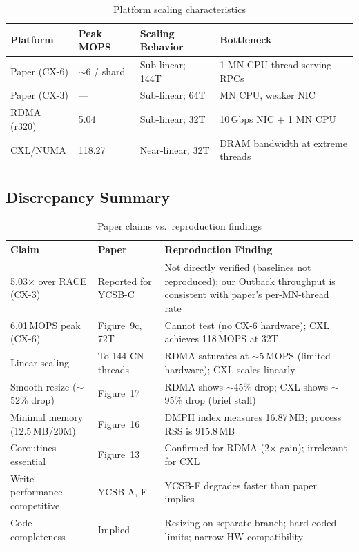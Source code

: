 \documentclass[11pt,a4paper]{article}
\begin{document}
\begin{table}[H]
\centering
\caption{Platform scaling characteristics}
\label{tab:scaling}
\small
\begin{tabular}{@{}p{2.5cm}p{2cm}p{3.3cm}p{4.5cm}@{}}
\toprule
\textbf{Platform} & \textbf{Peak MOPS} & \textbf{Scaling Behavior} & \textbf{Bottleneck} \\
\midrule
Paper (CX-6) & $\sim$6 / shard & Sub-linear; 144T & 1 MN CPU thread serving RPCs \\
Paper (CX-3) & --- & Sub-linear; 64T & MN CPU, weaker NIC \\
RDMA (r320)  & 5.04 & Sub-linear; 32T & 10\,Gbps NIC + 1 MN CPU \\
CXL/NUMA     & 118.27 & Near-linear; 32T & DRAM bandwidth at extreme threads \\
\bottomrule
\end{tabular}
\end{table}

\subsection{Discrepancy Summary}

\begin{table}[H]
\centering
\caption{Paper claims vs.\ reproduction findings}
\label{tab:discrepancy}
\small
\begin{tabular}{@{}p{3.0cm}p{3.5cm}p{6cm}@{}}
\toprule
\textbf{Claim} & \textbf{Paper} & \textbf{Reproduction Finding} \\
\midrule
5.03$\times$ over RACE (CX-3) & Reported for YCSB-C & Not directly verified (baselines not reproduced); our Outback throughput is consistent with paper's per-MN-thread rate \\
6.01\,MOPS peak (CX-6) & Figure~9c, 72T & Cannot test (no CX-6 hardware); CXL achieves 118\,MOPS at 32T \\
Linear scaling & To 144 CN threads & RDMA saturates at $\sim$5\,MOPS (limited hardware); CXL scales linearly \\
Smooth resize ($\sim$52\% drop) & Figure~17 & RDMA shows $\sim$45\% drop; CXL shows $\sim$95\% drop (brief stall) \\
Minimal memory (12.5\,MB/20M) & Figure~16 & DMPH index measures 16.87\,MB; process RSS is 915.8\,MB \\
Coroutines essential & Figure~13 & Confirmed for RDMA (2$\times$ gain); irrelevant for CXL \\
Write performance competitive & YCSB-A, F & YCSB-F degrades faster than paper implies \\
Code completeness & Implied & Resizing on separate branch; hard-coded limits; narrow HW compatibility \\
\bottomrule
\end{tabular}
\end{table}
\end{document}
